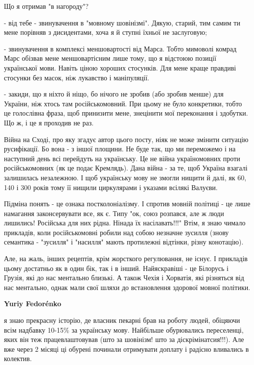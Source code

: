 \begin{itemize}
\begin{itemize}
Що я отримав "в нагороду"?

- від тебе - звинувачення в "мовному шовінізмі". Дякую, старий, тим самим ти
мене порівняв з дисидентами, хоча я й ступні їхньої не заслуговую;

- звинувачення в комплексі меншовартості від Марса. Тобто мимоволі комрад Марс
обізвав мене меншовартісним лише тому, що я відстоюю позиції української мови.
Навіть ціною хороших стосунків. Для мене краще правдиві стосунки без масок, ніж
лукавство і маніпуляції.

- закиди, що я ніхто й ніщо, бо нічого не зробив (або зробив менше) для
України, ніж хтось там російськомовний. При цьому не було конкретики, тобто це
голослівна фраза, щоб принизити мене, знецінити мої переконання і здобутки. Що
ж, і це я проходив не раз.

Війна на Сході, про яку згадує автор цього посту, ніяк не може змінити ситуацію
русифікації. Бо вона - з іншої площини. Не буде так, що ми переможемо і на
наступний день всі перейдуть на українську. Це не війна україномовних проти
російськомовних (як це подає Кремлядь). Дана війна - за те, щоб Україна взагалі
залишилась незалежною. І щоб українську мову не змогли нищити й далі, як 60,
140 і 300 років тому її нищили циркулярами і указами всілякі Валуєви.

Підміна понять - це ознака постколоніалізму. І спротив мовній політиці - це
лише намагання законсервувати все, як є. Типу "ок, союз розпався, але ж люди
лишились! Російська для них рідна. Нінада їх насілавать!!!" Втім, я знаю чимало
прикладів, коли російськомовні робили над собою незначне зусилля (знову
семантика - "зусилля" і "насилля" мають протилежні відтінки, різну конотацію).

Але, на жаль, інших рецептів, крім жорсткого регулювання, не існує. І прикладів
цьому достатньо як в один бік, так і в інший. Найяскравіші - це Білорусь і
Грузія, які до нас ментально близькі. А також Чехія і Хорватія, які різняться
від нас ментально, однак мали свої шляхи до встановлення здорової мовної
політики.


 
\textbf{Yuriy Fedorénko} 

я знаю прекрасну історію, де власник пекарні брав на роботу людей, обіцяючи
всім надбавку 10-15\% за українську мову. Найбільше обурювались переселенці,
яких він теж працевлаштовував (што за шовінізм! што за діскрімінатсия!!!). Але
вже через 2 місяці ці обурені починали отримувати доплату і радісно вливались в
колектив.


\end{itemize}
\end{itemize}

